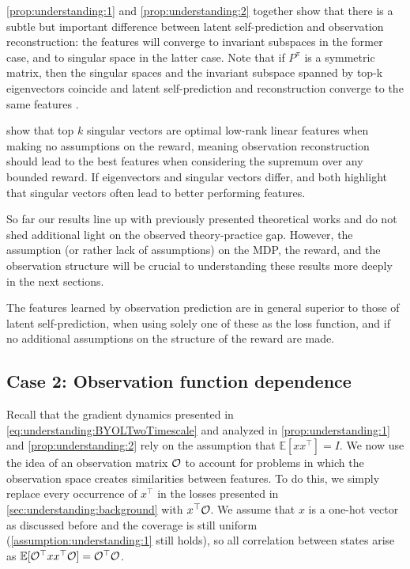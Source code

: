 \autoref{prop:understanding:1} and \autoref{prop:understanding:2} together show that there is a subtle but important difference between latent self-prediction and observation reconstruction: the features will converge to invariant subspaces in the former case, and to singular space in the latter case.
Note that if $P^\pi$ is a symmetric matrix, then the singular spaces and the invariant subspace spanned by top-k eigenvectors coincide and latent self-prediction and reconstruction converge to the same features \parencite{tang2022understanding}.

\textcite{behzadian2019fast} show that top $k$ singular vectors are optimal low-rank linear features when making no assumptions on the reward, meaning observation reconstruction should lead to the best features when considering the supremum over any bounded reward.
If eigenvectors and singular vectors differ, \textcite{behzadian2019fast} and \textcite{lelan2023bootstrapped} both highlight that singular vectors often lead to better performing features.

So far our results line up with previously presented theoretical works and do not shed additional light on the observed theory-practice gap.
However, the assumption (or rather lack of assumptions) on the MDP, the reward, and the observation structure will be crucial to understanding these results more deeply in the next sections.

\begin{tcolorbox}[boxrule=0.2mm,colback=white,colframe=uoftblue,boxsep=0pt,top=3pt,bottom=5pt]
\begin{insight} The features learned by observation prediction are in general superior to those of latent self-prediction, when using solely one of these as the loss function, and if no additional assumptions on the structure of the reward are made.
\label{insight:understanding:1}
\end{insight}
\end{tcolorbox}

\subsection{Case 2: Observation function dependence}
\label{sec:understanding:observation}

Recall that the gradient dynamics presented in \autoref{eq:understanding:BYOLTwoTimescale} and analyzed in \autoref{prop:understanding:1} and \autoref{prop:understanding:2} rely on the assumption that $\mathbb{E}[xx^\top] = I$.
We now use the idea of an observation matrix ${\mathcal{O}}$ to account for problems in which the observation space creates similarities between features.
To do this, we simply replace every occurrence of $x^\top$ in the losses presented in \autoref{sec:understanding:background} with $x^\top {\mathcal{O}}$.
We assume that $x$ is a one-hot vector as discussed before and the coverage is still uniform (\autoref{assumption:understanding:1} still holds), so all correlation between states arise as $\mathbb{E}[{\mathcal{O}}^\top x x^\top{\mathcal{O}}] = {\mathcal{O}}^\top {\mathcal{O}}$.

